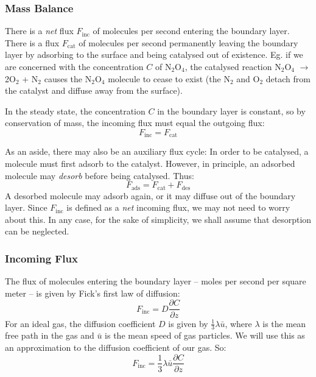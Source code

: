 \documentclass[12pt, a4paper, twoside, openright]{book}
\newcommand{\Finc}{\ensuremath{F_{\mathrm{inc}}}}
\newcommand{\Fads}{\ensuremath{F_{\mathrm{ads}}}}
\newcommand{\Fdes}{\ensuremath{F_{\mathrm{des}}}}
\newcommand{\Fcat}{\ensuremath{F_{\mathrm{cat}}}}
\begin{document}
\subsubsection{Mass Balance}
There is a \emph{net} flux $\Finc$ of molecules per second entering the boundary layer.  There is a flux $\Fcat$ of molecules per second permanently leaving the boundary layer by adsorbing to the surface and being catalysed out of existence.  Eg. if we are concerned with the concentration $C$ of N$_2$O$_4$, the catalysed reaction N$_2$O$_4$ $ \to$ 2O$_2$ + N$_2$ causes the N$_2$O$_4$ molecule to cease to exist (the N$_2$ and O$_2$ detach from the catalyst and diffuse away from the surface).

In the steady state, the concentration $C$ in the boundary layer is constant, so by conservation of mass, the incoming flux must equal the outgoing flux:
\begin{equation}
\Finc = \Fcat
\end{equation}

As an aside, there may also be an auxiliary flux cycle:
In order to be catalysed, a molecule must first adsorb to the catalyst.  However, in principle, an adsorbed molecule may \emph{desorb} before being catalysed.  Thus:
\begin{equation}
\Fads = \Fcat + \Fdes
\end{equation}
A desorbed molecule may adsorb again, or it may diffuse out of the boundary layer.  Since $\Finc$ is defined as a \emph{net} incoming flux,
we may not need to worry about this.  In any case, for the sake of simplicity, we shall assume that desorption can be neglected.

\subsubsection{Incoming Flux}

The flux of molecules entering the boundary layer -- moles per second per square meter -- is given by Fick's first law of diffusion:
\begin{equation}
\Finc = D \frac{\partial C}{\partial z}
\end{equation}
For an ideal gas, the diffusion coefficient $D$ is given by $\frac{1}{3} \lambda \bar{u}$, where $\lambda$ is the mean free path in the gas and $\bar{u}$ is the mean speed of gas particles.  We will use this as an approximation to the diffusion coefficient of our gas. So:
\begin{equation}
\Finc = \frac{1}{3} \lambda \bar{u} \frac{\partial C}{\partial z}
\end{equation}
\end{document}
